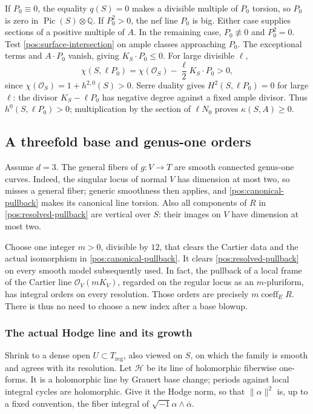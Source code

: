\documentclass[11pt,letterpaper]{article}
\newcommand{\Q}{\mathbb{Q}}
\newcommand{\OO}{\mathcal{O}}
\newcommand{\ii}{\sqrt{-1}}
\DeclareMathOperator{\Pic}{Pic}
\theoremstyle{definition}
\theoremstyle{remark}
\begin{document}
If \(P_0\equiv0\), the equality \(q(S)=0\) makes a divisible
multiple of \(P_0\) torsion, so \(P_0\) is zero in
\(\Pic(S)\otimes\Q\). If \(P_0^2>0\), the nef line \(P_0\) is
big. Either case supplies sections of a positive multiple of \(A\).
In the remaining case, \(P_0\not\equiv0\) and \(P_0^2=0\).
Test \eqref{pos:surface-intersection} on ample classes approaching
\(P_0\). The exceptional terms and \(A\cdot P_0\) vanish, giving
\(K_S\cdot P_0\leq0\). For large divisible \(\ell\),
\begin{equation}\label{pos:surface-riemann-roch}
 \chi(S,\ell P_0)
 =\chi(\OO_S)-\frac{\ell}{2}K_S\cdot P_0>0,
\end{equation}
since \(\chi(\OO_S)=1+h^{2,0}(S)>0\). Serre duality gives
\(H^2(S,\ell P_0)=0\) for large \(\ell\): the divisor
\(K_S-\ell P_0\) has negative degree against a fixed ample divisor.
Thus \(h^0(S,\ell P_0)>0\); multiplication by the section of
\(\ell N_0\) proves \(\kappa(S,A)\geq0\).

\subsection{A threefold base and genus-one orders}

Assume \(d=3\). The general fibers of \(g:V\to T\) are smooth
connected genus-one curves. Indeed, the singular locus of normal
\(V\) has dimension at most two, so misses a general fiber; generic
smoothness then applies, and \eqref{pos:canonical-pullback} makes its
canonical line torsion. Also all components of \(R\) in
\eqref{pos:resolved-pullback} are vertical over \(S\): their images
on \(V\) have dimension at most two.

Choose one integer \(m>0\), divisible by \(12\), that clears the
Cartier data and the actual isomorphism in
\eqref{pos:canonical-pullback}. It clears
\eqref{pos:resolved-pullback} on every smooth model subsequently
used. In fact, the pullback of a local frame of the Cartier line
\(\OO_V(mK_V)\), regarded on the regular locus as an
\(m\)-pluriform, has integral orders on every resolution. Those
orders are precisely \(m\operatorname{coeff}_E R\). There is thus
no need to choose a new index after a base blowup.

\subsubsection{The actual Hodge line and its growth}

Shrink to a dense open \(U\subset T_{\mathrm{reg}}\), also viewed
on \(S\), on which the family is smooth and agrees with its resolution.
Let \(\mathcal H\) be its line of holomorphic fiberwise one-forms.
It is a holomorphic line by Grauert base change; periods against local
integral cycles are holomorphic. Give it the Hodge norm, so that
\(\|\alpha\|^2\) is, up to a fixed convention, the fiber integral
of \(\ii\alpha\wedge\overline\alpha\).
\end{document}
